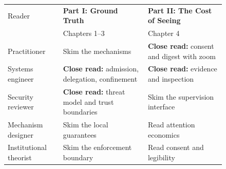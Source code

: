 \begingroup
\makeatletter\let\@xfloat\pd@orig@xfloat\makeatother
{}\label{book:reader-left}
\begin{figure}[H]
\centering
{\pdfiglabel\renewcommand{\arraystretch}{1.7}\setlength{\tabcolsep}{5pt}%
\begin{tabularx}{\linewidth}{@{}p{2.2cm}XX@{}}
\toprule
Reader & \textbf{Part I: Ground Truth} & \textbf{Part II: The Cost of Seeing}\\
 & Chapters 1--3 & Chapter 4\\
\midrule
Practitioner & Skim the mechanisms & \textbf{Close read:} consent and digest with zoom\\
Systems engineer & \textbf{Close read:} admission, delegation, confinement & \textbf{Close read:} evidence and inspection\\
Security reviewer & \textbf{Close read:} threat model and trust boundaries & Skim the supervision interface\\
Mechanism designer & Skim the local guarantees & Read attention economics\\
Institutional theorist & Skim the enforcement boundary & Read consent and legibility\\
\bottomrule
\end{tabularx}}
\end{figure}
\pdreaderleftprose
\clearpage
{}\label{book:reader-right}
